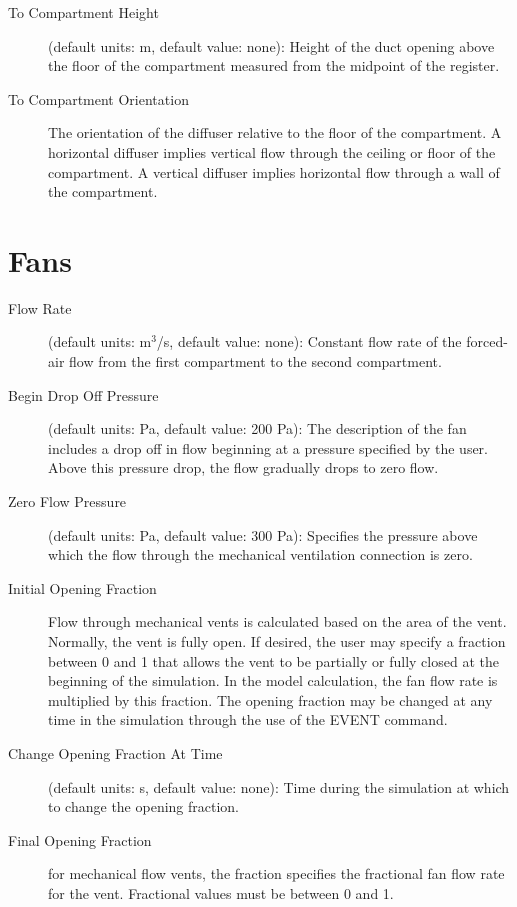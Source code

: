 \begin{description}
\item[To Compartment Height] (default units: m, default value: none): Height of the duct opening above the floor of the compartment measured from the midpoint of the register.

\item[To Compartment Orientation] The orientation of the diffuser relative to the floor of the compartment.  A horizontal diffuser implies vertical flow through the ceiling or floor of the compartment.  A vertical diffuser implies horizontal flow through a wall of the compartment.
\end{description}

\section{Fans}

\begin{description}
\item[Flow Rate] (default units: m$^3$/s, default value: none): Constant flow rate of the forced-air flow from the first compartment to the second compartment.

\item[Begin Drop Off Pressure] (default units: Pa, default value: 200 Pa): The description of the fan includes a drop off in flow beginning at a pressure specified by the user.  Above this pressure drop, the flow gradually drops to zero flow.

\item[Zero Flow Pressure] (default units: Pa, default value: 300 Pa): Specifies the pressure above which the flow through the mechanical ventilation connection is zero.

\item[Initial Opening Fraction] Flow through mechanical vents is calculated based on the area of the vent.  Normally, the vent is fully open.  If desired, the user may specify a fraction between 0 and 1 that allows the vent to be partially or fully closed at the beginning of the simulation.  In the model calculation, the fan flow rate is multiplied by this fraction.  The opening fraction may be changed at any time in the simulation through the use of the EVENT command.

\item[Change Opening Fraction At Time] (default units: s, default value: none): Time during the simulation at which to change the opening fraction.

\item[Final Opening Fraction] for mechanical flow vents, the fraction specifies the fractional fan flow rate for the vent. Fractional values must be between 0 and 1.
\end{description}

